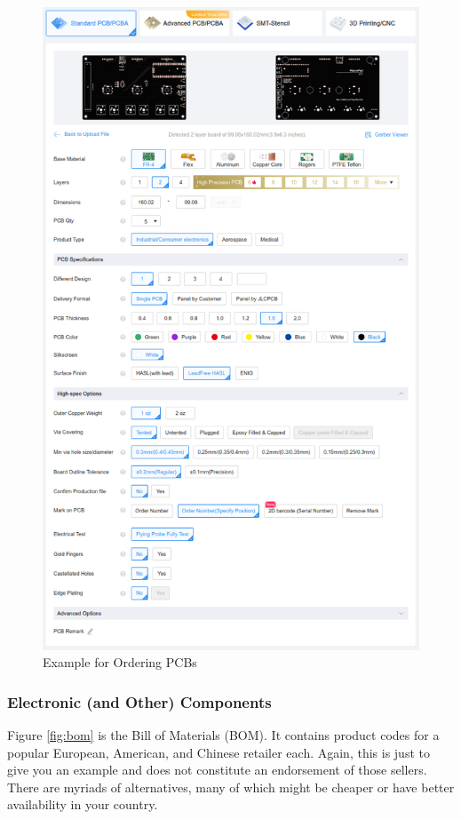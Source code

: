 \documentclass{article}
\begin{document}
\begin{figure}[htb]
\centering
\includegraphics[scale=0.5]{Images/PcbOrderingExample.png}
\caption{Example for Ordering PCBs}
\label{fig:pcb_ordering_example}
\end{figure}

\subsubsection{Electronic (and Other) Components}
Figure \ref{fig:bom} is the Bill of Materials (BOM).
It contains product codes for a popular European, American, and Chinese retailer each. Again, this is just to give you an example and does not constitute an endorsement of those sellers. There are myriads of alternatives, many of which might be cheaper or have better availability in your country.
\end{document}

